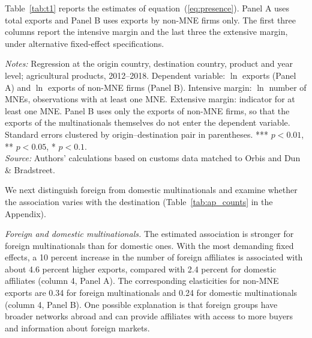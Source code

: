 \documentclass[11pt,a4paper]{article}
\newcommand{\srcnote}{\textit{Source:} Authors' calculations based on customs data matched to Orbis and Dun \& Bradstreet.}
\begin{document}
Table~\ref{tab:t1} reports the estimates of equation~(\ref{eq:presence}). Panel A uses total
exports and Panel B uses exports by non-MNE firms only. The first three columns report the intensive
margin and the last three the extensive margin, under alternative fixed-effect specifications.
\begin{table}[H]\centering\small%
  \caption{Multinational Presence and Agricultural Exports}%
  \label{tab:t1}%
  \par\vspace{3pt}%
  \begin{minipage}{0.95\textwidth}\footnotesize %
  \textit{Notes:} Regression at the origin country, destination country, product and year level; agricultural products, 2012--2018. Dependent variable: $\ln$ exports (Panel A) and $\ln$ exports of non-MNE firms (Panel B). Intensive margin: $\ln$ number of MNEs, observations with at least one MNE. Extensive margin: indicator for at least one MNE. Panel B uses only the exports of non-MNE firms, so that the exports of the multinationals themselves do not enter the dependent variable. Standard errors clustered by origin--destination pair in parentheses. *** $p<0.01$, ** $p<0.05$, * $p<0.1$.\\[3pt]%
  \srcnote%
  \end{minipage}%
  \end{table}
We next distinguish foreign from domestic multinationals and examine whether the association varies
with the destination (Table~\ref{tab:ap_counts} in the Appendix).

\emph{Foreign and domestic multinationals.} The estimated association is stronger for foreign
multinationals than for domestic ones. With the most demanding fixed effects, a 10 percent increase
in the number of foreign affiliates is associated with about 4.6 percent higher exports, compared
with 2.4 percent for domestic affiliates (column 4, Panel A). The corresponding elasticities for
non-MNE exports are 0.34 for foreign multinationals and 0.24 for domestic multinationals (column 4,
Panel B). One possible explanation is that foreign groups have broader networks abroad and can
provide affiliates with access to more buyers and information about foreign markets.
\end{document}
